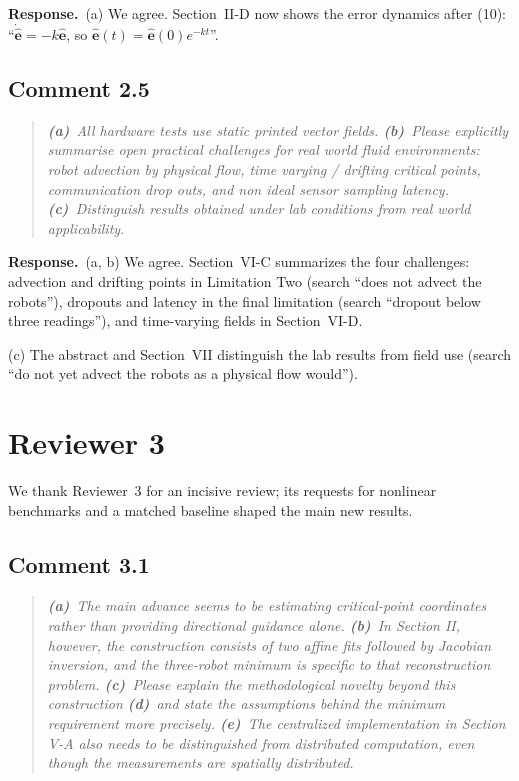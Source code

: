 \documentclass[10pt]{article}
\newcommand{\resp}{\par\textbf{Response.}~}
\begin{document}
\resp (a) We agree. Section~II-D now shows the error dynamics after (10): ``$\dot{\hat{\mathbf{e}}} = -k\hat{\mathbf{e}}$, so $\hat{\mathbf{e}}(t) = \hat{\mathbf{e}}(0)e^{-kt}$''.

\subsection*{Comment 2.5}

\begin{quote}\itshape
\textbf{(a)}~All hardware tests use static printed vector fields.
\textbf{(b)}~Please explicitly summarise open practical challenges for real world fluid environments: robot advection by physical flow, time varying / drifting critical points, communication drop outs, and non ideal sensor sampling latency.
\textbf{(c)}~Distinguish results obtained under lab conditions from real world applicability.
\end{quote}

\resp (a, b) We agree. Section~VI-C summarizes the four challenges: advection and drifting points in Limitation Two (search ``does not advect the robots''), dropouts and latency in the final limitation (search ``dropout below three readings''), and time-varying fields in Section~VI-D.

(c) The abstract and Section~VII distinguish the lab results from field use (search ``do not yet advect the robots as a physical flow would'').

\section*{Reviewer 3}

We thank Reviewer~3 for an incisive review; its requests for nonlinear benchmarks and a matched baseline shaped the main new results.

\subsection*{Comment 3.1}

\begin{quote}\itshape
\textbf{(a)}~The main advance seems to be estimating critical-point coordinates rather than providing directional guidance alone.
\textbf{(b)}~In Section II, however, the construction consists of two affine fits followed by Jacobian inversion, and the three-robot minimum is specific to that reconstruction problem.
\textbf{(c)}~Please explain the methodological novelty beyond this construction
\textbf{(d)}~and state the assumptions behind the minimum requirement more precisely.
\textbf{(e)}~The centralized implementation in Section V-A also needs to be distinguished from distributed computation, even though the measurements are spatially distributed.
\end{quote}
\end{document}
